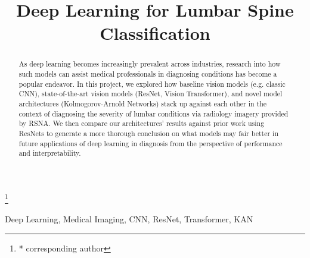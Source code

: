 \documentclass[conference]{IEEEtran}
\begin{document}
\title{Deep Learning for Lumbar Spine Classification}

\author{
\and
{}
\and
{}
}

\maketitle

\footnote{* corresponding author}


\begin{abstract}
As deep learning becomes increasingly prevalent across industries, research into how such models can assist medical professionals in diagnosing conditions has become a popular endeavor. In this project, we explored how baseline vision models (e.g. classic CNN), state-of-the-art vision models (ResNet, Vision Transformer), and novel model architectures (Kolmogorov-Arnold Networks) stack up against each other in the context of diagnosing the severity of lumbar conditions via radiology imagery provided by RSNA. We then compare our architectures' results against prior work using ResNets to generate a more thorough conclusion on what models may fair better in future applications of deep learning in diagnosis from the perspective of performance and interpretability.
\end{abstract}

\begin{IEEEkeywords}
Deep Learning, Medical Imaging, CNN, ResNet, Transformer, KAN
\end{IEEEkeywords}


\end{document}
